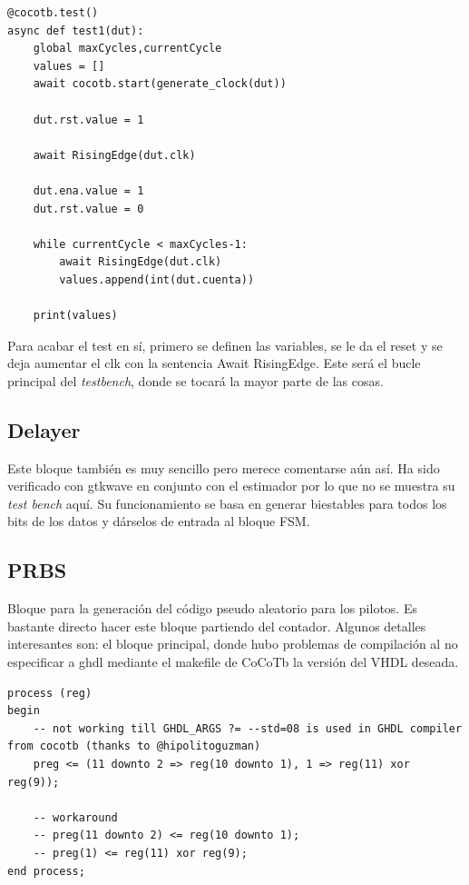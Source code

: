 \documentclass[11pt]{scrartcl} %
\begin{document}
\begin{preview}
\begin{verbatim}
@cocotb.test()
async def test1(dut):
    global maxCycles,currentCycle
    values = []
    await cocotb.start(generate_clock(dut))

    dut.rst.value = 1

    await RisingEdge(dut.clk)

    dut.ena.value = 1
    dut.rst.value = 0

    while currentCycle < maxCycles-1:
        await RisingEdge(dut.clk)
        values.append(int(dut.cuenta))

    print(values)
\end{verbatim}

Para acabar el test en sí, primero se definen las variables, se le da el reset y se deja aumentar el clk con la sentencia Await RisingEdge. Este será el bucle principal del \emph{testbench}, donde se tocará la mayor parte de las cosas. 

\subsection{Delayer}

Este bloque también es muy sencillo pero merece comentarse aún así. Ha sido verificado con gtkwave en conjunto con el estimador por lo que no se muestra su \emph{test bench} aquí. Su funcionamiento se basa en generar biestables para todos los bits de los datos y dárselos de entrada al bloque FSM.

\subsection{PRBS}

Bloque para la generación del código pseudo aleatorio para los pilotos. Es bastante directo hacer este bloque partiendo del contador. Algunos detalles interesantes son: el bloque principal, donde hubo problemas de compilación al no especificar a ghdl mediante el makefile de CoCoTb la versión del VHDL deseada.

\begin{verbatim}
process (reg)
begin
	-- not working till GHDL_ARGS ?= --std=08 is used in GHDL compiler from cocotb (thanks to @hipolitoguzman)
	preg <= (11 downto 2 => reg(10 downto 1), 1 => reg(11) xor reg(9));
	
	-- workaround
	-- preg(11 downto 2) <= reg(10 downto 1);
	-- preg(1) <= reg(11) xor reg(9);
end process;
\end{verbatim}


\end{preview}
\end{document}
